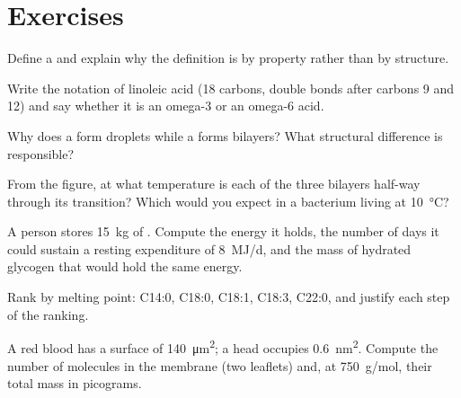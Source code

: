 \section{Exercises}

\begin{exercise}[$\star$]\label{exo:b1:lipids:1}
Define a  and explain why the definition is by property rather
than by structure.
\end{exercise}

\begin{exercise}[$\star$]\label{exo:b1:lipids:2}
Write the notation of linoleic acid (18 carbons, double bonds after
carbons 9 and 12) and say whether it is an omega-3 or an omega-6 acid.
\end{exercise}

\begin{exercise}[$\star$]\label{exo:b1:lipids:3}
Why does a  form droplets while a  forms
bilayers? What structural difference is responsible?
\end{exercise}

\begin{exercise}[$\star$]\label{exo:b1:lipids:4}
From the  figure, at what temperature is each of the three
bilayers half-way through its transition? Which would you expect in a
bacterium living at \qty{10}{\celsius}?
\end{exercise}

\begin{exercise}[$\star\star$]\label{exo:b1:lipids:5}
A person stores \qty{15}{kg} of . Compute the energy it holds, the
number of days it could sustain a resting expenditure of
\qty{8}{MJ/d}, and the mass of hydrated glycogen that would hold the
same energy.
\end{exercise}

\begin{exercise}[$\star\star$]\label{exo:b1:lipids:6}
Rank by melting point: C14:0, C18:0, C18:1, C18:3, C22:0, and justify
each step of the ranking.
\end{exercise}

\begin{exercise}[$\star\star$]\label{exo:b1:lipids:7}
A red blood  has a surface of \qty{140}{\micro m^2}; a 
head occupies \qty{0.6}{nm^2}. Compute the number of 
molecules in the membrane (two leaflets) and, at \qty{750}{g/mol},
their total mass in picograms.
\end{exercise}

